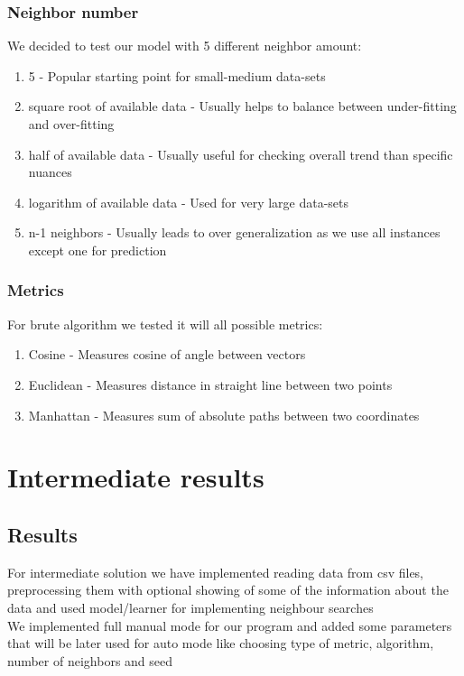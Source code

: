 \documentclass[12pt]{article}
\begin{document}
\subsubsection{Neighbor number}
We decided to test our model with 5 different neighbor amount:
\begin{enumerate}
  \item 5 - Popular starting point for small-medium data-sets
  \item square root of available data - Usually helps to balance between under-fitting and over-fitting
  \item half of available data - Usually useful for checking overall trend than specific nuances 
  \item logarithm of available data - Used for very large data-sets
  \item n-1 neighbors - Usually leads to over generalization as we use all instances except one for prediction
\end{enumerate}

\subsubsection{Metrics}
For brute algorithm we tested it will all possible metrics:
\begin{enumerate}
  \item Cosine - Measures cosine of angle between vectors 
  \item Euclidean - Measures distance in straight line between two points
  \item Manhattan - Measures sum of absolute paths between two coordinates 
\end{enumerate}

\section{Intermediate results}
\subsection{Results}
For intermediate solution we have implemented reading data from csv files, preprocessing them with optional showing of some of the information about the data and used model/learner for implementing neighbour searches \\ We implemented full manual mode for our program and added some parameters that will be later used for auto mode like choosing type of metric, algorithm, number of neighbors and seed
\end{document}
